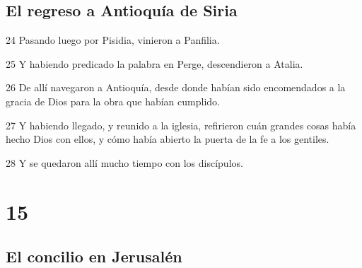 \section*{El regreso a Antioquía de Siria}

\par 24 Pasando luego por Pisidia, vinieron a Panfilia.
\par 25 Y habiendo predicado la palabra en Perge, descendieron a Atalia.
\par 26 De allí navegaron a Antioquía, desde donde habían sido encomendados a la gracia de Dios para la obra que habían cumplido.
\par 27 Y habiendo llegado, y reunido a la iglesia, refirieron cuán grandes cosas había hecho Dios con ellos, y cómo había abierto la puerta de la fe a los gentiles.
\par 28 Y se quedaron allí mucho tiempo con los discípulos.

\chapter{15}

\section*{El concilio en Jerusalén}


